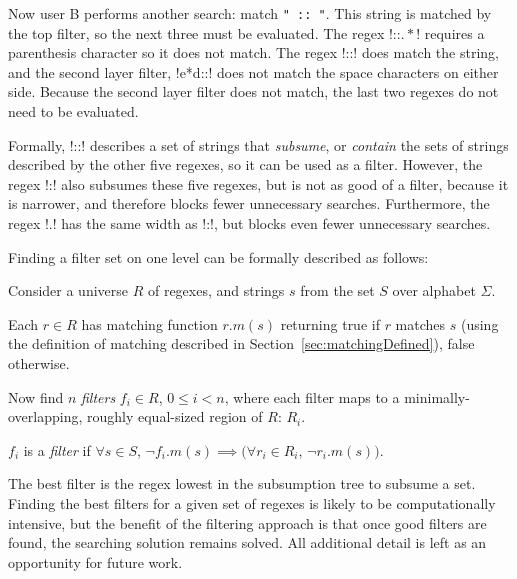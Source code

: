 Now user B performs another search: match \verb!" :: "!.  This string is matched by the top filter, so the next three must be evaluated.  The regex \cverb!::\(.*\)! requires a parenthesis character so it does not match.  The regex \cverb!\s*::\s*! does match the string, and the second layer filter, \cverb!e*d::! does not match the space characters on either side.  Because the second layer filter does not match, the last two regexes do not need to be evaluated.

Formally, \cverb!::! describes a set of strings that \emph{subsume}, or \emph{contain} the sets of strings described by the other five regexes, so it can be used as a filter.  However, the regex \cverb!:! also subsumes these five regexes, but is not as good of a filter, because it is narrower, and therefore blocks fewer unnecessary searches.   Furthermore, the regex \cverb!.! has the same width as \cverb!:!, but blocks even fewer unnecessary searches.

Finding a filter set on one level can be formally described as follows:

Consider a universe $R$ of regexes, and strings $s$ from the set $S$ over alphabet $\Sigma$.

Each $r\in R$ has matching function $r.m(s)$ returning true if $r$ matches $s$ (using the definition of matching described in Section~\ref{sec:matchingDefined}), false otherwise.

Now find $n$ \emph{filters} $f_i \in R$, $ 0\leq i< n$, where each filter maps to a minimally-overlapping, roughly equal-sized region of $R$: $R_i$.

$f_i$ is a \emph{filter} if $\forall s\in S$, $ \neg f_i.m(s) \implies (\forall r_i \in R_i$, $ \neg r_i.m(s))$.

The best filter is the regex lowest in the subsumption tree to subsume a set.  Finding the best filters for a given set of regexes is likely to be computationally intensive, but the benefit of the filtering approach is that once good filters are found, the searching solution remains solved.  All additional detail is left as an opportunity for future work.

